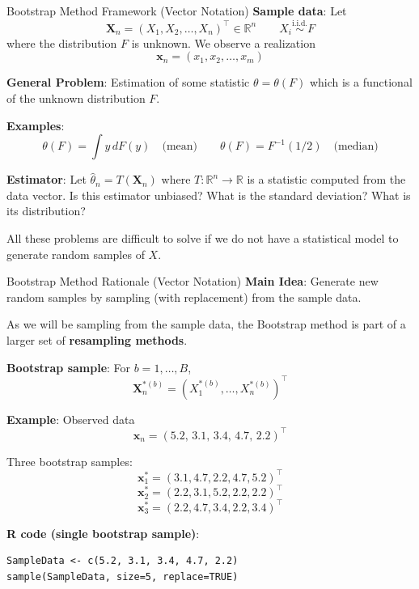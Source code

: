 \documentclass[8pt]{beamer}
\begin{document}
\begin{frame}{Bootstrap Method Framework (Vector Notation)}
\textbf{Sample data}:  
Let
\[
	\mathbf{X}_n = (X_1, X_2, \ldots, X_n)^\top \in \mathbb{R}^n \qquad X_i \stackrel{\text{i.i.d.}}{\sim} F
\]
where the distribution $F$ is unknown.  We observe a realization
\[
	\mathbf{x}_n = (x_1, x_2, \ldots, x_m)
\]

\textbf{General Problem}: Estimation of some statistic $\theta=\theta(F)$ which is a functional of the unknown distribution $F$.

\textbf{Examples}:
\[
\theta(F) = \int y \, dF(y) \quad \text{(mean)} \qquad  \theta(F) = F^{-1}(1/2) \quad \text{(median)}
\]

\textbf{Estimator}:  Let $\widehat{\theta}_n = T(\mathbf{X}_n)$ where $T : \mathbb{R}^n \to \mathbb{R}$ is a statistic computed from the data vector. Is this estimator unbiased? What is the standard deviation? What is its distribution?

\vspace{3mm}
  
All these problems are difficult to solve if we do not have a statistical model to generate random samples of $X$.
\end{frame}

\begin{frame}[fragile]{Bootstrap Method Rationale (Vector Notation)}
\textbf{Main Idea}: Generate new random samples by sampling (with replacement) from the sample data.

As we will be sampling from the sample data, the Bootstrap method is part of a larger set of \textbf{resampling methods}.

\textbf{Bootstrap sample}:  
For $b = 1,\dots,B$,
\[
\mathbf{X}_n^{*(b)} = (X_1^{*(b)}, \dots, X_n^{*(b)})^\top
\]

\vspace{2mm}

\textbf{Example}:  
Observed data
\[
\mathbf{x}_n = (5.2,\, 3.1,\, 3.4,\, 4.7,\, 2.2)^\top
\]

Three bootstrap samples:
\[
\mathbf{x}_1^* = (3.1, 4.7, 2.2, 4.7, 5.2)^\top
\]
\[
\mathbf{x}_2^* = (2.2, 3.1, 5.2, 2.2, 2.2)^\top
\]
\[
\mathbf{x}_3^* = (2.2, 4.7, 3.4, 2.2, 3.4)^\top
\]

\vspace{2mm}

\textbf{R code (single bootstrap sample)}:
\begin{lstlisting}
SampleData <- c(5.2, 3.1, 3.4, 4.7, 2.2)
sample(SampleData, size=5, replace=TRUE)
\end{lstlisting}

\end{frame}
\end{document}
